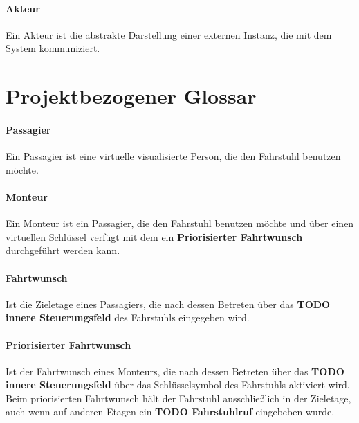 \paragraph{Akteur}
Ein Akteur ist die abstrakte Darstellung einer externen Instanz, die mit dem System kommuniziert.

\section{Projektbezogener Glossar}
\paragraph{Passagier}
Ein Passagier ist eine virtuelle visualisierte Person, die den Fahrstuhl benutzen möchte.

\paragraph{Monteur}
Ein Monteur ist ein Passagier, die den Fahrstuhl benutzen möchte und über einen virtuellen Schlüssel verfügt mit dem ein \textbf{Priorisierter Fahrtwunsch}
durchgeführt werden kann.

\paragraph{Fahrtwunsch}
Ist die Zieletage eines Passagiers, die nach dessen Betreten über das \textbf{TODO innere Steuerungsfeld} des Fahrstuhls eingegeben wird.


\paragraph{Priorisierter Fahrtwunsch}
Ist der Fahrtwunsch eines Monteurs, die nach dessen Betreten über das \textbf{TODO innere Steuerungsfeld} über das Schlüsselsymbol des Fahrstuhls aktiviert wird. Beim priorisierten Fahrtwunsch hält der Fahrstuhl ausschließlich in der Zieletage, auch wenn auf anderen Etagen ein \textbf{TODO Fahrstuhlruf} eingebeben wurde.

